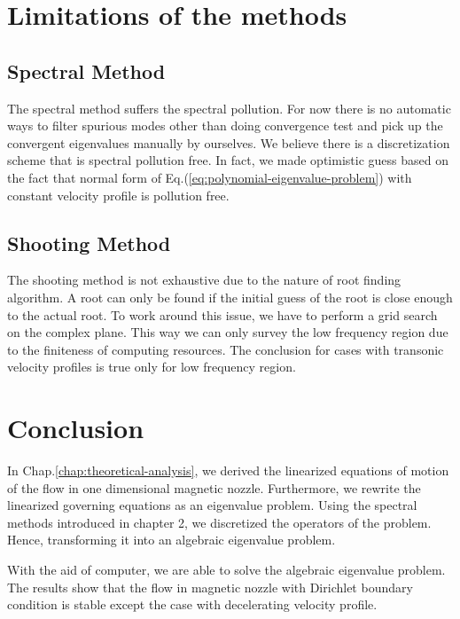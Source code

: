 \section{Limitations of the methods}
\subsection{Spectral Method}
The spectral method suffers the spectral pollution. For now there is no automatic ways to filter spurious modes other than doing convergence test and pick up the convergent eigenvalues manually by ourselves. We believe there is a discretization scheme that is spectral pollution free. In fact, we made optimistic guess based on the fact that normal form of Eq.(\ref{eq:polynomial-eigenvalue-problem}) with constant velocity profile is pollution free.

\subsection{Shooting Method}
The shooting method is not exhaustive due to the nature of root finding algorithm. A root can only be found if the initial guess of the root is close enough to the actual root. To work around this issue, we have to perform a grid search on the complex plane. This way we can only survey the low frequency region due to the finiteness of computing resources. The conclusion for cases with transonic velocity profiles is true only for low frequency region.

\section{Conclusion}
In Chap.\ref{chap:theoretical-analysis}, we derived the linearized equations of motion of the flow in one dimensional magnetic nozzle. Furthermore, we rewrite the linearized governing equations as an eigenvalue problem. Using the spectral methods introduced in chapter 2, we discretized the operators of the problem. Hence, transforming it into an algebraic eigenvalue problem.

With the aid of computer, we are able to solve the algebraic eigenvalue problem. The results show that the flow in magnetic nozzle with Dirichlet boundary condition is stable except the case with decelerating velocity profile.
